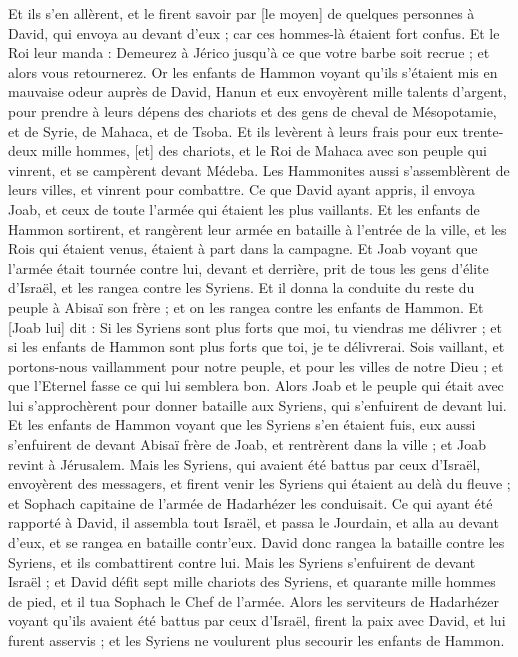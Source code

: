 \begin{multicols}{2}
Et ils s'en allèrent, et le firent savoir par [le moyen] de quelques personnes à David, qui envoya au devant d'eux ; car ces hommes-là étaient fort confus. Et le Roi leur manda : Demeurez à Jérico jusqu'à ce que votre barbe soit recrue ; et alors vous retournerez.
Or les enfants de Hammon voyant qu'ils s'étaient mis en mauvaise odeur auprès de David, Hanun et eux envoyèrent mille talents d'argent, pour prendre à leurs dépens des chariots et des gens de cheval de Mésopotamie, et de Syrie, de Mahaca, et de Tsoba.
Et ils levèrent à leurs frais pour eux trente-deux mille hommes, [et] des chariots, et le Roi de Mahaca avec son peuple qui vinrent, et se campèrent devant Médeba. Les Hammonites aussi s'assemblèrent de leurs villes, et vinrent pour combattre.
Ce que David ayant appris, il envoya Joab, et ceux de toute l'armée qui étaient les plus vaillants.
Et les enfants de Hammon sortirent, et rangèrent leur armée en bataille à l'entrée de la ville, et les Rois qui étaient venus, étaient à part dans la campagne.
Et Joab voyant que l'armée était tournée contre lui, devant et derrière, prit de tous les gens d'élite d'Israël, et les rangea contre les Syriens.
Et il donna la conduite du reste du peuple à Abisaï son frère ; et on les rangea contre les enfants de Hammon.
Et [Joab lui] dit : Si les Syriens sont plus forts que moi, tu viendras me délivrer ; et si les enfants de Hammon sont plus forts que toi, je te délivrerai.
Sois vaillant, et portons-nous vaillamment pour notre peuple, et pour les villes de notre Dieu ; et que l'Eternel fasse ce qui lui semblera bon.
Alors Joab et le peuple qui était avec lui s'approchèrent pour donner bataille aux Syriens, qui s'enfuirent de devant lui.
Et les enfants de Hammon voyant que les Syriens s'en étaient fuis, eux aussi s'enfuirent de devant Abisaï frère de Joab, et rentrèrent dans la ville ; et Joab revint à Jérusalem.
Mais les Syriens, qui avaient été battus par ceux d'Israël, envoyèrent des messagers, et firent venir les Syriens qui étaient au delà du fleuve ; et Sophach capitaine de l'armée de Hadarhézer les conduisait.
Ce qui ayant été rapporté à David, il assembla tout Israël, et passa le Jourdain, et alla au devant d'eux, et se rangea en bataille contr'eux. David donc rangea la bataille contre les Syriens, et ils combattirent contre lui.
Mais les Syriens s'enfuirent de devant Israël ; et David défit sept mille chariots des Syriens, et quarante mille hommes de pied, et il tua Sophach le Chef de l'armée.
Alors les serviteurs de Hadarhézer voyant qu'ils avaient été battus par ceux d'Israël, firent la paix avec David, et lui furent asservis ; et les Syriens ne voulurent plus secourir les enfants de Hammon.

\end{multicols}
